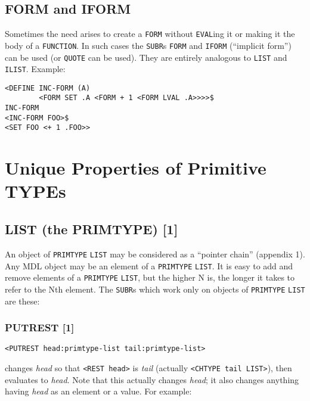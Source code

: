 \documentclass[a4paper]{scrbook}
\begin{document}
\subsection{FORM and IFORM}\label{form-and-iform}

Sometimes the need arises to create a \texttt{FORM} without \texttt{EVAL}ing it or making it
the body of a \texttt{FUNCTION}. In such cases the \texttt{SUBR}s \texttt{FORM} and
\texttt{IFORM} (``implicit form'') can be used (or \texttt{QUOTE} can be used). They are
entirely analogous to \texttt{LIST} and \texttt{ILIST}. Example:

\begin{verbatim}
<DEFINE INC-FORM (A)
        <FORM SET .A <FORM + 1 <FORM LVAL .A>>>>$
INC-FORM
<INC-FORM FOO>$
<SET FOO <+ 1 .FOO>>
\end{verbatim}

\section{Unique Properties of Primitive TYPEs}\label{unique-properties-of-primitive-types}

\subsection{LIST (the PRIMTYPE) {[}1{]}}\label{list-the-primtype-1}

An object of \texttt{PRIMTYPE} \texttt{LIST} may be considered as a ``pointer chain'' (appendix
1). Any MDL object may be an element of a \texttt{PRIMTYPE} \texttt{LIST}. It is easy to add and remove elements of a
\texttt{PRIMTYPE} \texttt{LIST}, but the higher N is, the longer it takes to refer to the Nth element. The \texttt{SUBR}s
which work only on objects of \texttt{PRIMTYPE} \texttt{LIST} are these:

\subsubsection{PUTREST {[}1{]}}\label{putrest-1}

\begin{verbatim}
<PUTREST head:primtype-list tail:primtype-list>
\end{verbatim}

 changes \emph{head} so that \texttt{\textless{}REST\ head\textgreater{}} is \emph{tail}
(actually \texttt{\textless{}CHTYPE\ tail\ LIST\textgreater{}}), then evaluates to \emph{head}. Note that this actually
changes \emph{head}; it also changes anything having \emph{head} as an element or a value. For example:
\end{document}
